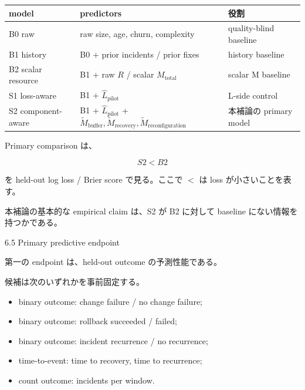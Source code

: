 \documentclass[12pt,a4paper]{article}
\begin{document}
{\def\LTcaptype{table} %
\begin{longtable}[]{@{}
  >{\raggedright\arraybackslash}p{}
  >{\raggedright\arraybackslash}p{}
  >{\raggedright\arraybackslash}p{}@{}}
\toprule\noalign{}
\begin{minipage}[b]{\linewidth}\raggedright
model
\end{minipage} & \begin{minipage}[b]{\linewidth}\raggedright
predictors
\end{minipage} & \begin{minipage}[b]{\linewidth}\raggedright
役割
\end{minipage} \\
\midrule\noalign{}
\endhead
\bottomrule\noalign{}
\endlastfoot
B0 raw & raw size, age, churn, complexity & quality-blind baseline \\
B1 history & B0 + prior incidents / prior fixes & history baseline \\
B2 scalar resource & B1 + raw \(R\) / scalar \(M_{\mathrm{total}}\) & scalar M baseline \\
S1 loss-aware & B1 + \(\hat L_{\mathrm{pilot}}\) & L-side control \\
S2 component-aware & B1 + \(\hat L_{\mathrm{pilot}}\) + \(\widetilde M_{\mathrm{buffer}},\widetilde M_{\mathrm{recovery}},\widetilde M_{\mathrm{reconfiguration}}\) & 本補論の primary model \\
\end{longtable}
}

Primary comparison は、

\[
S2 < B2
\]

を held-out log loss / Brier score で見る。ここで \(<\) は loss が小さいことを表す。

本補論の基本的な empirical claim は、S2 が B2 に対して baseline にない情報を持つかである。

6.5 Primary predictive endpoint

第一の endpoint は、held-out outcome の予測性能である。

候補は次のいずれかを事前固定する。

\begin{itemize}
\tightlist
\item
  binary outcome: change failure / no change failure;
\item
  binary outcome: rollback succeeded / failed;
\item
  binary outcome: incident recurrence / no recurrence;
\item
  time-to-event: time to recovery, time to recurrence;
\item
  count outcome: incidents per window.
\end{itemize}
\end{document}
